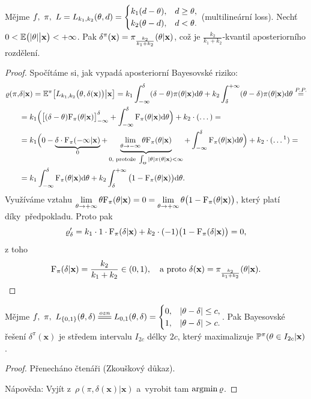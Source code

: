 \begin{theorem}\label{veta7}
	Mějme $f,~\pi,~L=L_{k_1,k_2}(\theta,d)=\begin{cases}
	k_1(d-\theta),&d\geq \theta, \\ k_2(\theta-d),& d<\theta.
	\end{cases}$ (multilineární loss). Nechť $0<\mathbb{E}\big(|\theta|\big|\textbf{x}\big)<+\infty$. Pak $\delta^\pi(\textbf{x})=\pi_{\frac{k_2}{k_1+k_2}}(\theta|\textbf{x})$, což je $\frac{k_2}{k_1+k_2}$-kvantil aposteriorního rozdělení.	
	
	\begin{proof}
		Spočítáme si, jak vypadá aposteriorní Bayesovské riziko:
		\[
		\begin{split}
		\rho(\pi,&\delta|\textbf{x})=\E^{\pi}\big[L_{k_1,k_2}\big(\t,\delta(\textbf{x})\big)\big| \textbf{x}\big]=k_1\int_{-\infty}^\delta (\delta-\t)\pi(\t|\textbf{x})\d\t+k_2\int_\delta^{+\infty}(\t-\delta)\pi(\t|\textbf{x})\d\t\stackrel{P.P.}{=}\\
		&=k_1\Big(\big[(\delta-\t)\FF_\pi(\t|\textbf{x})\big]_{-\infty}^\delta+\int_{-\infty}^\delta \FF_\pi(\t|\textbf{x})\d\t\Big)+k_2\cdot (\dots)=\\
		&=k_1\Big( 0-\underbrace{\delta\cdot\FF_\pi(-\infty|\textbf{x})}_{0}+\underbrace{\lim\limits_{\t\to-\infty}\t\FF_\pi(\t|\textbf{x})}_{0\text{, protože }\int_\Theta |\t|\pi(\t|\textbf{x})<\infty}+\int_{-\infty}^\delta \FF_\pi(\t|\textbf{x})\d\t \Big)+k_2\cdot (\dots\text{\footnotemark})=\\
		&=k_1\int_{-\infty}^\delta \FF_\pi(\t|\textbf{x})\d\t+k_2\int_\delta^{+\infty}\big(1-\FF_\pi(\t|\textbf{x})\big)\d\t.
		\end{split}
		\]
		Využíváme vztahu
		$\lim\limits_{\theta\to+\infty}\theta\mathrm{F}_{\pi}(\theta|\textbf{x})=0=\lim\limits_{\theta\to+\infty}\theta\big(1-\mathrm{F}_{\pi}(\theta|\textbf{x})\big)$, který platí díky~předpokladu.			Proto pak
		$$\varrho_\delta'=k_1\cdot 1\cdot\mathrm{F}_\pi(\delta|\textbf{x})+k_2\cdot(-1)\big(1-\mathrm{F}_\pi(\delta|\textbf{x})\big)=0,$$
		z toho
		$$\mathrm{F}_\pi(\delta|\textbf{x})=\frac{k_2}{k_1+k_2}\in(0,1),\quad\text{a proto } \delta(\textbf{x})=\pi_{\frac{k_2}{k_1+k_2}}(\theta|\textbf{x}).$$
		
	\end{proof} 
	
	
\end{theorem}
\begin{theorem}
	Mějme $f,~\pi,~L_{\{0,1\}}(\t,\delta)\equal{ozn}L_{0,1}(\t,\delta)=\begin{cases}
	0,&|\t-\delta|\leq c,\\1,& |\t-\delta|>c.
	\end{cases}$. Pak Bayesovské řešení $\delta^\pi(\textbf{x})$ je středem intervalu $I_{2c}$ délky $2c$, který maximalizuje $\mathbb{P}^\pi(\theta\in I_{2c}|\textbf{x})$.
	\begin{proof}
		Přenecháno čtenáři (Zkouškový důkaz).
		
		Nápověda: Vyjít z~$\rho(\pi,\delta(\textbf{x})|\textbf{x})$ a~vyrobit tam $\mathop{\mathrm{argmin}} \varrho$.
	\end{proof}
\end{theorem}
\FloatBarrier

